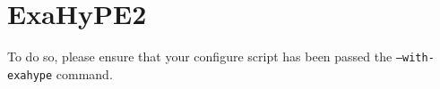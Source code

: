 \chapter{ExaHyPE2}
\label{section:python-api-examples:finite-volumes}


To do so, please ensure that your configure script has been passed the
\texttt{--with-exahype} command.
